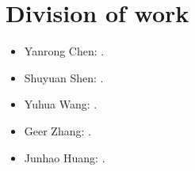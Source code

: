 \section{Division of work}
\begin{itemize}
    \item Yanrong Chen: .
    \item Shuyuan Shen: .
    \item Yuhua Wang: .
    \item Geer Zhang: .
    \item Junhao Huang: .
\end{itemize}
